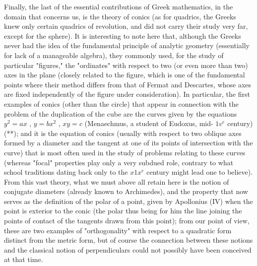 Finally, the last of the essential contributions of Greek mathematics, in the domain that concerns us, is the theory of conics (as for quadrics, the Greeks knew only certain quadrics of revolution, and did not carry their study very far, except for the sphere). It is interesting to note here that, although the Greeks never had the idea of the fundamental principle of analytic geometry (essentially for lack of a manageable algebra), they commonly used, for the study of particular "figures," the "ordinates" with respect to two (or even more than two) axes in the plane (closely related to the figure, which is one of the fundamental points where their method differs from that of Fermat and Descartes, whose axes are fixed independently of the figure under consideration). In particular, the first examples of conics (other than the circle) that appear in connection with the problem of the duplication of the cube are the curves given by the equations \(y^{2} = ax\) , \(y = bx^{2}\) , \(xy = c\) (Menaechmus, a student of Eudoxus, mid- \(1v^{e}\) century) (**); and it is the equation of conics (usually with respect to two oblique axes formed by a diameter and the tangent at one of its points of intersection with the curve) that is most often used in the study of problems relating to these curves (whereas "focal" properties play only a very subdued role, contrary to what school traditions dating back only to the \(x1x^{e}\) century might lead one to believe). From this vast theory, what we must above all retain here is the notion of conjugate diameters (already known to Archimedes), and the property that now serves as the definition of the polar of a point, given by Apollonius (IV) when the point is exterior to the conic (the polar thus being for him the line joining the points of contact of the tangents drawn from this point); from our point of view, these are two examples of "orthogonality" with respect to a quadratic form distinct from the metric form, but of course the connection between these notions and the classical notion of perpendiculars could not possibly have been conceived at that time.

